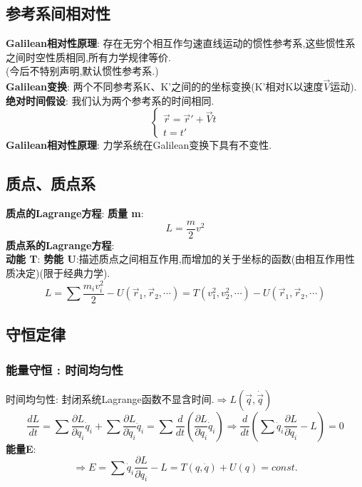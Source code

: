\documentclass{article}
\begin{document}
\subsection{参考系间相对性}
\textbf{Galilean相对性原理}: 存在无穷个相互作匀速直线运动的惯性参考系,这些惯性系之间时空性质相同,所有力学规律等价.\\
(今后不特别声明,默认惯性参考系.)\\
\textbf{Galilean变换}: 两个不同参考系K、K'之间的的坐标变换(K'相对K以速度$\vec V$运动).\\
\textbf{绝对时间假设}: 我们认为两个参考系的时间相同.
\begin{displaymath}
    \left\{ \begin{array}{ll}
    \vec r = \vec r' + \vec V t\\
    t = t'
    \end{array} \right.
\end{displaymath}
\textbf{Galilean相对性原理}: 力学系统在Galilean变换下具有不变性.


\subsection{质点、质点系}
\textbf{质点的Lagrange方程}:
\textbf{质量 m}:
\[L = \frac{m}{2} v^2\]
\textbf{质点系的Lagrange方程}:\\
\textbf{动能 T}: \quad \textbf{势能 U}:描述质点之间相互作用,而增加的关于坐标的函数(由相互作用性质决定)(限于经典力学).
\[L = \sum \frac{m_i v_i^2}{2} - U(\vec r_1,\vec r_2,\cdots ) = T(v_1^2,v_2^2,\cdots) - U(\vec r_1,\vec r_2,\cdots )\]



\subsection{守恒定律}
\subsubsection{能量守恒 : 时间均匀性}
时间均匀性: 封闭系统Lagrange函数不显含时间.\quad $\Rightarrow L(\vec q,\dot \vec q)$\\
\[\frac{dL}{dt}
 = \sum \frac{\partial L}{\partial q_i} \dot q_i + \sum \frac{\partial L}{\partial \dot q_i} \ddot q_i
 = \sum \frac{d}{dt}(\frac{\partial L}{\partial \dot q_i}\dot q_i)
\Rightarrow \frac{d}{dt}(\sum \dot q_i \frac{\partial L}{\partial \dot q_i} - L) = 0\]
\textbf{能量E}: 
\[\Rightarrow E = \sum \dot q_i \frac{\partial L}{\partial \dot q_i} - L  = T(q,\dot q) + U(q) = const.\]
\end{document}
